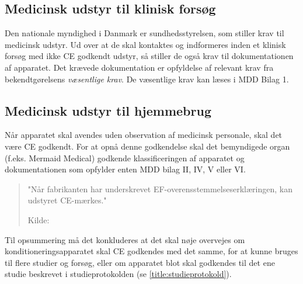 \subsection{Medicinsk udstyr til klinisk forsøg}
Den nationale myndighed i Danmark er sundhedsstyrelsen, som stiller krav til medicinsk udstyr. Ud over at de skal kontaktes og indformeres inden et klinisk forsøg med ikke CE godkendt udstyr, så stiller de også krav til dokumentationen af apparatet. Det krævede dokumentation er opfyldelse af relevant krav fra bekendtgørelsens \textit{væsentlige krav}. De væsentlige krav kan læses i MDD Bilag 1.

\subsection{Medicinsk udstyr til hjemmebrug}
Når apparatet skal avendes uden observation af medicinsk personale, skal det være CE godkendt. For at opnå denne godkendelse skal det bemyndigede organ (f.eks. Mermaid Medical) godkende klassificeringen af apparatet og dokumentationen som opfylder enten MDD bilag II, IV, V eller VI. 

\begin{quote}
	"Når fabrikanten har underskrevet EF-overensstemmelseserklæringen, kan udstyret CE-mærkes."
	
	Kilde: 
\end{quote}

Til opsummering må det konkluderes at det skal nøje overvejes om konditioneringsapparatet skal CE godkendes med det samme, for at kunne bruges til flere studier og forsøg, eller om apparatet blot skal godkendes til det ene studie beskrevet i studieprotokolden (se \ref{title:studieprotokold}).

